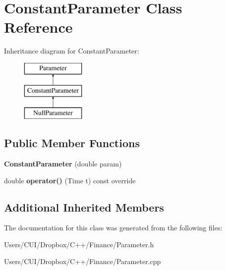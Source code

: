\hypertarget{class_constant_parameter}{}\section{Constant\+Parameter Class Reference}
\label{class_constant_parameter}
Inheritance diagram for Constant\+Parameter\+:\begin{figure}[H]
\begin{center}
\leavevmode
\includegraphics[height=3.000000cm]{class_constant_parameter}
\end{center}
\end{figure}
\subsection*{Public Member Functions}
\begin{DoxyCompactItemize}
\item 
\hypertarget{class_constant_parameter_ae3bc9ec65c93b6b88fe04dcb7010d897}{}\label{class_constant_parameter_ae3bc9ec65c93b6b88fe04dcb7010d897} 
{\bfseries Constant\+Parameter} (double param)
\item 
\hypertarget{class_constant_parameter_a23abb141692843e2ef68d43f610beb5e}{}\label{class_constant_parameter_a23abb141692843e2ef68d43f610beb5e} 
double {\bfseries operator()} (Time t) const override
\end{DoxyCompactItemize}
\subsection*{Additional Inherited Members}


The documentation for this class was generated from the following files\+:\begin{DoxyCompactItemize}
\item 
Users/\+C\+U\+I/\+Dropbox/\+C++/\+Finance/Parameter.\+h\item 
Users/\+C\+U\+I/\+Dropbox/\+C++/\+Finance/Parameter.\+cpp\end{DoxyCompactItemize}
